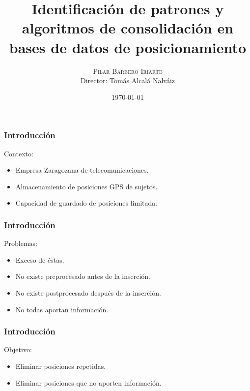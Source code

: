 \documentclass[10pt, spanish]{beamer}
\title{Identificaci\'on de patrones y algoritmos de consolidaci\'on en bases de datos de posicionamiento}
\date{\today}
\author{\textsc{\Large{Pilar Barbero Iriarte}}\\
Director: Tom\'as Alcal\'a Nalv\'aiz}
\institute{Universidad de Zaragoza}
\begin{document}
\maketitle



\begin{frame}[fragile]
\frametitle{Introducci\'on}
Contexto: 
\begin{itemize}
	\item Empresa Zaragozana de telecomunicaciones.
	\item Almacenamiento de posiciones GPS de sujetos.
	\item Capacidad de guardado de posiciones limitada.
\end{itemize}
\end{frame}


\begin{frame}[fragile]
\frametitle{Introducci\'on}
Problemas:
	\begin{itemize}
		\item Exceso de \'estas.
		\item No existe preprocesado antes de la inserci\'on.
		\item No existe postprocesado despu\'es de la inserci\'on.
		\item No todas aportan informaci\'on.
	\end{itemize}
\end{frame}

\begin{frame}[fragile]
  \frametitle{Introducci\'on}
  Objetivo:
  \begin{itemize}
  	  \item Eliminar posiciones repetidas.
  	  \item Eliminar posiciones que no aporten informaci\'on.
   \end{itemize}
\end{frame}

\end{document}
